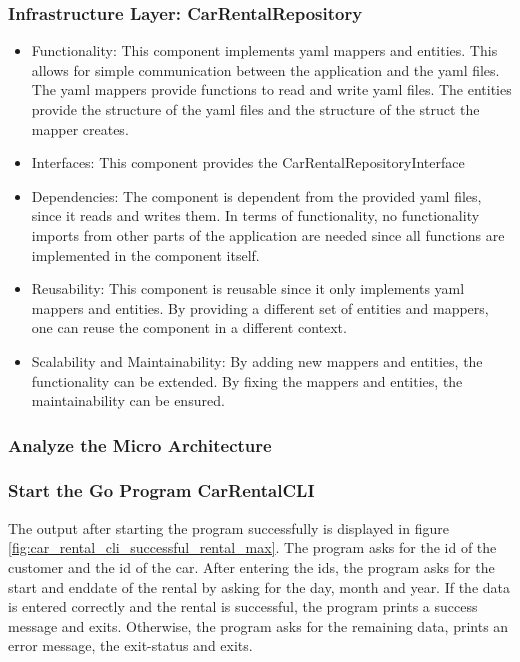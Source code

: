 \subsubsection*{Infrastructure Layer: CarRentalRepository}
\begin{itemize}
    \item Functionality: This component implements yaml mappers and entities. 
          This allows for simple communication between the application and the yaml files.
          The yaml mappers provide functions to read and write yaml files.
          The entities provide the structure of the yaml files and the structure of the struct the mapper creates.
    \item Interfaces: This component provides the CarRentalRepositoryInterface
    \item Dependencies: The component is dependent from the provided yaml files, since it reads and writes them.
          In terms of functionality, no functionality imports from other parts of the application are needed since all functions are implemented in the component itself.
    \item Reusability: This component is reusable since it only implements yaml mappers and entities.
          By providing a different set of entities and mappers, one can reuse the component in a different context.
    \item Scalability and Maintainability: By adding new mappers and entities, the functionality can be extended.
          By fixing the mappers and entities, the maintainability can be ensured.
\end{itemize}

\subsubsection*{Analyze the Micro Architecture}

\subsubsection*{Start the Go Program CarRentalCLI}
The output after starting the program successfully is displayed in figure \ref*{fig:car_rental_cli_successful_rental_max}.
The program asks for the id of the customer and the id of the car.
After entering the ids, the program asks for the start and enddate of the rental by asking for the day, month and year.
If the data is entered correctly and the rental is successful, the program prints a success message and exits.
Otherwise, the program asks for the remaining data, prints an error message, the exit-status and exits.

